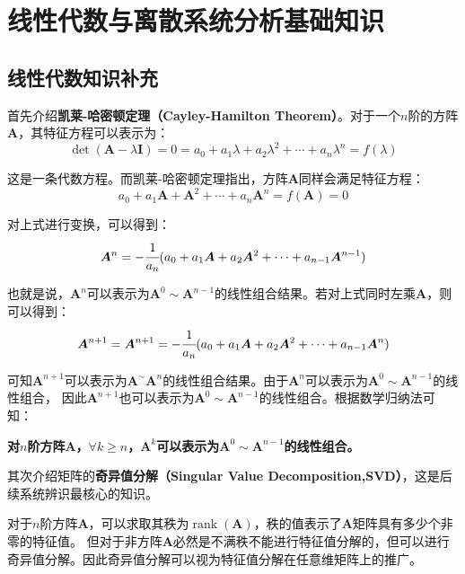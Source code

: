 \newpage
\section{线性代数与离散系统分析基础知识}
\subsection{线性代数知识补充}
首先介绍\textbf{凯莱-哈密顿定理（Cayley-Hamilton Theorem）}。对于一个\(n\)阶的方阵\(\bm{A}\)，其特征方程可以表示为：
\begin{equation*}
    \det(\bm{A}-\lambda \bm{I}) = 0 = a_{0}+a_{1}\lambda+a_{2}\lambda^2+\cdots+a_{n}\lambda^n=f(\lambda)
\end{equation*}

这是一条代数方程。而凯莱-哈密顿定理指出，方阵\(\bm{A}\)同样会满足特征方程：
\begin{equation*}
    a_{0}+a_{1}\bm{A}+\bm{A}^2+\cdots+a_{n}\bm{A}^n=f(\bm{A})=0
\end{equation*}

对上式进行变换，可以得到：
\begin{equation*}
    \bm{A}^n = -\cfrac{1}{a_{n}}(a_{0}+a_{1}\bm{A}+a_{2}\bm{A}^2+\cdots+a_{n-1}\bm{A}^{n-1})
\end{equation*}

也就是说，\(\bm{A}^n\)可以表示为\(\bm{A}^0\sim \bm{A}^{n-1}\)的线性组合结果。若对上式同时左乘\(\bm{A}\)，则可以得到：
\begin{equation*}
    \bm{A}^{n+1} = \bm{A}^{n+1} = -\cfrac{1}{a_{n}}(a_{0}+a_{1}\bm{A}+a_{2}\bm{A}^2+\cdots+a_{n-1}\bm{A}^{n})
\end{equation*}

可知\(\bm{A}^{n+1}\)可以表示为\(\bm{A}^\sim \bm{A}^{n}\)的线性组合结果。由于\(\bm{A}^n\)可以表示为\(\bm{A}^0\sim \bm{A}^{n-1}\)的线性组合，
因此\(\bm{A}^{n+1}\)也可以表示为\(\bm{A}^0\sim \bm{A}^{n-1}\)的线性组合。根据数学归纳法可知：

\textbf{对\(n\)阶方阵\(\bm{A}\)，\(\forall k\ge n\)，\(\bm{A}^k\)可以表示为\(\bm{A}^0\sim \bm{A}^{n-1}\)的线性组合。}

其次介绍矩阵的\textbf{奇异值分解（Singular Value Decomposition,SVD）}，这是后续系统辨识最核心的知识。

对于\(n\)阶方阵\(\bm{A}\)，可以求取其秩为\(\operatorname{rank}(\bm{A})\)，秩的值表示了\(\bm{A}\)矩阵具有多少个非零的特征值。
但对于非方阵\(\bm{A}\)必然是不满秩不能进行特征值分解的，但可以进行奇异值分解。因此奇异值分解可以视为特征值分解在任意维矩阵上的推广。

